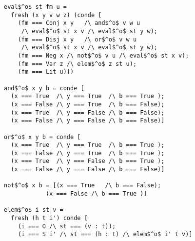 

\begin{figure}[!t]
  \centering
  \begin{minipage}{0.49\textwidth}
    \begin{lstlisting}[label={prop}, caption={Relational evaluator of logic formulas}, captionpos=b, frame=tb]
eval$^o$ st fm u =
  fresh (x y v w z) (conde [
    (fm === Conj x y   /\ and$^o$ v w u
     /\ eval$^o$ st x v /\ eval$^o$ st y w);
    (fm === Disj x y   /\ or$^o$ v w u
     /\ eval$^o$ st x v /\ eval$^o$ st y w);
    (fm === Neg x /\ not$^o$ v u /\ eval$^o$ st x v);
    (fm === Var z /\ elem$^o$ z st u);
    (fm === Lit u)])

and$^o$ x y b = conde [
  (x === True  /\ y === True  /\ b === True );
  (x === False /\ y === True  /\ b === False);
  (x === True  /\ y === False /\ b === False);
  (x === False /\ y === False /\ b === False)]

or$^o$ x y b = conde [
  (x === True  /\ y === True  /\ b === True );
  (x === False /\ y === True  /\ b === True );
  (x === True  /\ y === False /\ b === True );
  (x === False /\ y === False /\ b === False)]

not$^o$ x b = [(x === True   /\ b === False);
            (x === False /\ b === True )]

elem$^o$ i st v =
  fresh (h t i') conde [
    (i === O /\ st === (v : t));
    (i === S i' /\ st === (h : t) /\ elem$^o$ i' t v)]
    \end{lstlisting}
  \end{minipage}
\end{figure}
